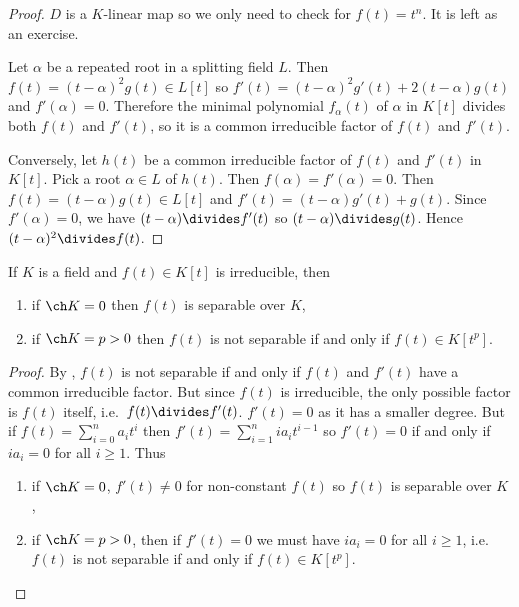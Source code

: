 \documentclass[a4paper]{article}
\begin{document}
\begin{proof}
  \(D\) is a \(K\)-linear map so we only need to check for \(f(t) = t^n\). It is left as an exercise.

  Let \(\alpha\) be a repeated root in a splitting field \(L\). Then \(f(t) = (t - \alpha)^2 g(t) \in L[t]\) so \(f'(t) = (t - \alpha)^2g'(t) + 2(t - \alpha)g(t)\) and \(f'(\alpha) = 0\). Therefore the minimal polynomial \(f_\alpha(t)\) of \(\alpha\) in \(K[t]\) divides both \(f(t)\) and \(f'(t)\), so it is a common irreducible factor of \(f(t)\) and \(f'(t)\).

  Conversely, let \(h(t)\) be a common irreducible factor of \(f(t)\) and \(f'(t)\) in \(K[t]\). Pick a root \(\alpha \in L\) of \(h(t)\). Then \(f(\alpha) = f'(\alpha) = 0\). Then \(f(t) = (t - \alpha)g(t) \in L[t]\) and \(f'(t) = (t - \alpha)g'(t) + g(t)\). Since \(f'(\alpha) = 0\), we have \((t - \alpha) \divides f'(t)\) so \((t -\alpha) \divides g(t)\). Hence \((t - \alpha)^2 \divides f(t)\).
\end{proof}

\begin{corollary}
  If \(K\) is a field and \(f(t) \in K[t]\) is irreducible, then
  \begin{enumerate}
  \item if \(\ch K = 0\) then \(f(t)\) is separable over \(K\),
  \item if \(\ch K = p > 0\) then \(f(t)\) is not separable if and only if \(f(t) \in K[t^p]\).
  \end{enumerate}
\end{corollary}

\begin{proof}
  By , \(f(t)\) is not separable if and only if \(f(t)\) and \(f'(t)\) have a common irreducible factor. But since \(f(t)\) is irreducible, the only possible factor is \(f(t)\) itself, i.e.\ \(f(t) \divides f'(t)\). \(f'(t) = 0\) as it has a smaller degree. But if \(f(t) = \sum_{i = 0}^{n} a_it^i\) then \(f'(t) = \sum_{i = 1}^{n} ia_it^{i - 1}\) so \(f'(t) = 0\) if and only if \(ia_i = 0\) for all \(i \geq 1\). Thus
  \begin{enumerate}
  \item if \(\ch K = 0\), \(f'(t) \neq 0\) for non-constant \(f(t)\) so \(f(t)\) is separable over \(K\),
  \item if \(\ch K = p > 0\), then if \(f'(t) = 0\) we must have \(ia_i = 0\) for all \(i \geq 1\), i.e.\ \(f(t)\) is not separable if and only if \(f(t) \in K[t^p]\).
  \end{enumerate}
\end{proof}
\end{document}
